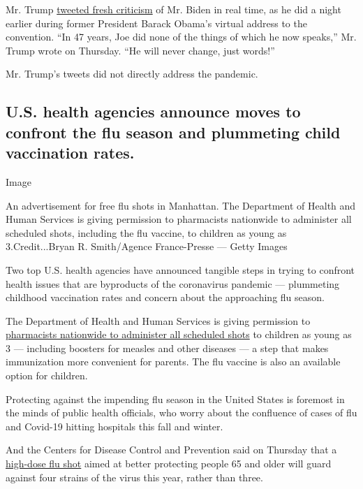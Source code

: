 Mr. Trump
\href{https://twitter.com/realDonaldTrump/status/1296645682875506688}{tweeted
fresh criticism} of Mr. Biden in real time, as he did a night earlier
during former President Barack Obama's virtual address to the
convention. ``In 47 years, Joe did none of the things of which he now
speaks,'' Mr. Trump wrote on Thursday. ``He will never change, just
words!''

Mr. Trump's tweets did not directly address the pandemic.

\hypertarget{us-health-agencies-announce-moves-to-confront-the-flu-season-and-plummeting-child-vaccination-rates}{%
\subsection{U.S. health agencies announce moves to confront the flu
season and plummeting child vaccination
rates.}\label{us-health-agencies-announce-moves-to-confront-the-flu-season-and-plummeting-child-vaccination-rates}}

Image

An advertisement for free flu shots in Manhattan. The Department of
Health and Human Services is giving permission to pharmacists nationwide
to administer all scheduled shots, including the flu vaccine, to
children as young as 3.Credit...Bryan R. Smith/Agence France-Presse ---
Getty Images

Two top U.S. health agencies have announced tangible steps in trying to
confront health issues that are byproducts of the coronavirus pandemic
--- plummeting childhood vaccination rates and concern about the
approaching flu season.

The Department of Health and Human Services is giving permission to
\href{https://www.hhs.gov/about/news/2020/08/19/hhs-expands-access-childhood-vaccines-during-covid-19-pandemic.html}{pharmacists
nationwide to administer all scheduled shots} to children as young as 3
--- including boosters for measles and other diseases --- a step that
makes immunization more convenient for parents. The flu vaccine is also
an available option for children.

Protecting against the impending flu season in the United States is
foremost in the minds of public health officials, who worry about the
confluence of cases of flu and Covid-19 hitting hospitals this fall and
winter.

And the Centers for Disease Control and Prevention said on Thursday that
a
\href{https://www.cdc.gov/mmwr/volumes/69/rr/rr6908a1.htm?s_cid=rr6908a1_w}{high-dose
flu shot} aimed at better protecting people 65 and older will guard
against four strains of the virus this year, rather than three.

